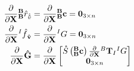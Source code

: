 \begin{align}
    \nonumber \partialX{}{{\BB}}\hat{r}_{\hat{\mathbf{\hat{v}}}} &= \partialX{}{{\BB}\com} = \ZERO_{3 \times n} \\ 
    \nonumber \partialX{} {^I\hat{f}}_{\mathbf{\hat{v}}} &= \partialX{}{^IG} = \ZERO_{3 \times n} \\ 
    \partialX{}\mathbf{\hat{G}} &= \partialX{}
    \begin{bmatrix}
    \S{{{\BB}\com}}
	\partialX{}{^B\T_I}{^IG}\\
	\ZERO_{3 \times n}
	\end{bmatrix} 
\end{align}
